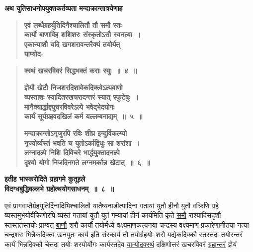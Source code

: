 \documentclass[11pt, openany]{book}
\begin{document}
{\small \textbf{अथ युतिसाधनोपयुक्तकर्तव्यता मन्दाक्रान्तात्रयेणाह\textendash }}

 \label{8.4.1}
\begin{quote}
{\large \textbf{{\color{purple}एवं लब्धैग्रहर्युतिदिनैश्चालितौ तौ समौ स्तः \\
कार्यौ बाणाविह शशिशरः संस्कृतोऽसौ स्वनत्या~। \\
एकान्याशौ यदि खगशरावन्तरैक्यं तयोर्यत् \\
याम्योद-}}}
\end{quote}

\newpage

 \label{8.4}
\begin{quote}
{\large \textbf{{\color{purple}क्स्थं खचरविवरं सिद्धभक्तं कराः स्युः~॥~४~॥}}
\vspace{1mm}

 \label{8.5}
\textbf{{\color{purple}ज्ञेयौ खेटौ निजशरदिशावेकदिक्त्वेऽल्पबाणो
\\
व्यस्ताशः स्यादितरखचरादन्तरं स्यात् स्फुटेषुः~।\\
मानैक्यार्द्धाद्द्युचरविवरेऽल्पे भवेद्भेदयोगः \\
कार्यं सूर्यग्रहवदखिलं कर्म यल्लम्बनाद्यम्~॥~५~॥}}
\vspace{1mm}

 \label{8.6}
\textbf{{\color{purple}मन्दाक्रान्तोऽनृजुरपि रविः शीघ्र इन्दुर्विकल्प्यो
\\
नृज्योर्व्यस्तं भवति च युतोऽर्काद्विधुः सा शरांशा~।\\
लग्नादल्पे निशि दिविचरे भार्द्धयुक्तादनल्पे \\
दृश्यो योगो निजदिनगते लग्नमर्कान्न खेटात्~॥~६~॥}}}
\end{quote}

\begin{center}
{\large \textbf{इतीह भास्करोदिते ग्रहागमे कुतूहले \\
विदग्धबुद्धिवल्लभे ग्रहोत्थयोगसाधनम्~॥~८~॥}}
\end{center}

\begin{sloppypar}
एवं प्रागवाप्तैर्ग्रहयुतिर्दिनादिभिश्चालितौ यातैष्यनाडीत्यादिना गतायां युतौ हीनौ युतौ वक्रिणि ग्रहे व्यस्तमुभयोर्वक्रिणोरपि व्यस्तं गतायां युतौ युतं गम्यायां हीनं कार्यमिति कृते \hyperref[8.4.1]{समौ} राश्यादिसदृशौ स्तस्ततस्तयोः प्राग्वत् \hyperref[8.4.1]{बाणौ} शरौ कार्यौ तयोर्मध्ये वक्ष्यमाणकल्पनया चन्द्रस्य वक्ष्यमाण-प्रकारेणानीतया नत्या चन्द्रशरः भिन्नैकदिक्त्व ऊनयुतः कार्य इति संस्कार्य तौ तयोर्ग्रहयोः शरौ यद्येकदिक्कौ स्तस्तदा तयोरन्तरं कार्यं भिन्नदिक्कौ चेत्तदा तयोः शरयोर्योगः कार्यस्तदेव \hyperref[8.4.1]{याम्योदक्स्थं} दक्षिणोत्तरं खचरविवरं \hyperref[8.4]{ग्रहान्तरं} ज्ञेयं
\end{sloppypar}
\end{document}

